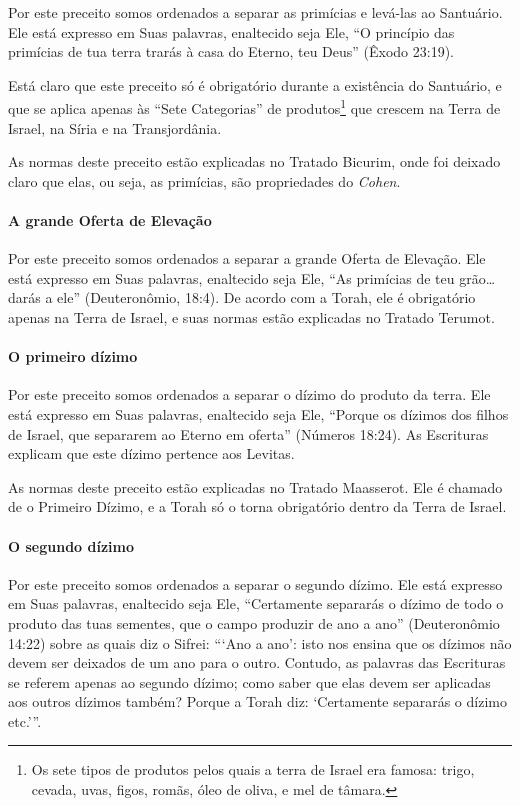 Por este preceito somos ordenados a separar as primícias e levá-las ao
Santuário. Ele está expresso em Suas palavras, enaltecido seja Ele, ``O
princípio das primícias de tua terra trarás à casa do Eterno, teu
Deus'' (Êxodo 23:19).

Está claro que este preceito só é obrigatório durante a existência do
Santuário, e que se aplica apenas às ``Sete Categorias'' de
produtos\footnote{Os sete tipos de produtos pelos quais a terra de Israel era famosa:
  trigo, cevada, uvas, figos, romãs, óleo de oliva, e mel de tâmara.} que crescem na Terra de Israel, na Síria
e na Transjordânia.

As normas deste preceito estão explicadas no Tratado Bicurim, onde foi deixado claro que elas, ou seja, as primícias, são propriedades do \textit{Cohen}.

\paragraph{A grande Oferta de Elevação}

Por este preceito somos ordenados a separar a grande Oferta de
Elevação. Ele está expresso em Suas palavras, enaltecido seja Ele, ``As
primícias de teu grão\ldots{} darás a ele'' (Deuteronômio, 18:4). De acordo
com a Torah, ele é obrigatório apenas na Terra de Israel, e suas normas
estão explicadas no Tratado Terumot.

\paragraph{O primeiro dízimo}

Por este preceito somos ordenados a separar o dízimo do produto da
terra. Ele está expresso em Suas palavras, enaltecido seja Ele, ``Porque
os dízimos dos filhos de Israel, que separarem ao Eterno em oferta''
(Números 18:24). As Escrituras explicam que este dízimo pertence aos
Levitas.

As normas deste preceito estão explicadas no Tratado Maasserot. Ele é
chamado de o Primeiro Dízimo, e a Torah só o torna obrigatório dentro da
Terra de Israel.

\paragraph{O segundo dízimo}

Por este preceito somos ordenados a separar o segundo dízimo. Ele está
expresso em Suas palavras, enaltecido seja Ele, ``Certamente separarás o
dízimo de todo o produto das tuas sementes, que o campo produzir de ano
a ano'' (Deuteronômio 14:22) sobre as quais diz o Sifrei: ```Ano a ano':
isto nos ensina que os dízimos não devem ser deixados de um ano para o
outro. Contudo, as palavras das Escrituras se referem apenas ao segundo
dízimo; como saber que elas devem ser aplicadas aos outros dízimos
também? Porque a Torah diz: `Certamente separarás o dízimo etc.'''.

